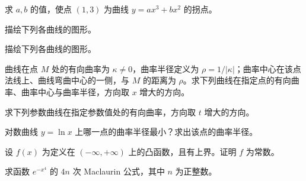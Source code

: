\noindent\begin{minipage}{\textwidth}
求 $a,b$ 的值，使点 $(1,3)$ 为曲线 $y=ax^3+bx^2$ 的拐点。
\end{minipage}\par\vfill
\newpage
\noindent\begin{minipage}{\textwidth}
描绘下列各曲线的图形。
\end{minipage}\par\vfill
\noindent\begin{minipage}{\textwidth}
描绘下列各曲线的图形。
\end{minipage}\par\vfill
\noindent\begin{minipage}{\textwidth}
曲线在点 $M$ 处的有向曲率为 $\kappa\ne0$，曲率半径定义为 $\rho=1/|\kappa|$；曲率中心在该点法线上、曲线弯曲中心的一侧，与 $M$ 的距离为 $\rho$。求下列曲线在指定点的有向曲率、曲率中心与曲率半径，方向取 $x$ 增大的方向。
\end{minipage}\par\vfill
\noindent\begin{minipage}{\textwidth}
求下列参数曲线在指定参数值处的有向曲率，方向取 $t$ 增大的方向。
\end{minipage}\par\vfill
\newpage
\noindent\begin{minipage}{\textwidth}
对数曲线 $y=\ln x$ 上哪一点的曲率半径最小？求出该点的曲率半径。
\end{minipage}\par\vfill
\noindent\begin{minipage}{\textwidth}
设 $f(x)$ 为定义在 $(-\infty,+\infty)$ 上的凸函数，且有上界。证明 $f$ 为常数。
\end{minipage}\par\vfill
\noindent\begin{minipage}{\textwidth}
求函数 $e^{-x^4}$ 的 $4n$ 次 Maclaurin 公式，其中 $n$ 为正整数。
\end{minipage}\par\vfill
